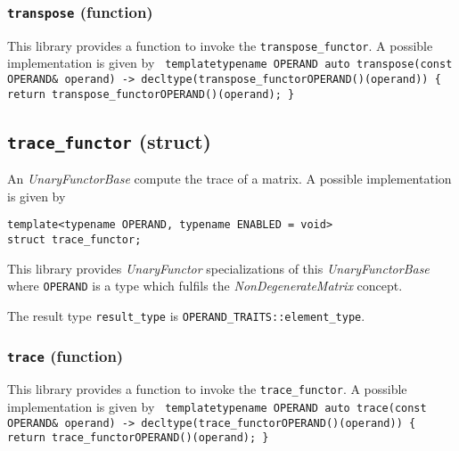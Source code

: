 \documentclass[oneside]{book}
\begin{document}
\subsubsection{\texttt{transpose} (function)}
This library provides a function to invoke the \texttt{transpose\_functor}.
A possible implementation is given by\newline
\texttt{
template\textlangle typename OPERAND\textrangle\newline
auto transpose(const OPERAND\& operand)\newline
-> decltype(transpose\_functor\textlangle OPERAND\textrangle()(operand))\newline
\{ return transpose\_functor\textlangle OPERAND\textrangle()(operand); \}
}

\subsection{\texttt{trace\_functor} (struct)}
An \textit{UnaryFunctorBase} compute the trace of a matrix.
A possible implementation is given by
\begin{verbatim}
template<typename OPERAND, typename ENABLED = void>
struct trace_functor;
\end{verbatim}

\noindent{}This library provides \textit{UnaryFunctor} specializations of this
\textit{UnaryFunctorBase} where \texttt{OPERAND} is a type which fulfils   the
\textit{NonDegenerateMatrix} concept.\newline

\noindent{}The result type \texttt{result\_type} is \texttt{OPERAND\_TRAITS::element\_type}.

\subsubsection{\texttt{trace} (function)}
This library provides a function to invoke the \texttt{trace\_functor}.
A possible implementation is given by\newline
\texttt{
template\textlangle typename OPERAND\textrangle\newline
auto trace(const OPERAND\& operand)\newline
-> decltype(trace\_functor\textlangle OPERAND\textrangle()(operand))\newline
\{ return trace\_functor\textlangle OPERAND\textrangle()(operand); \}
}
\end{document}
